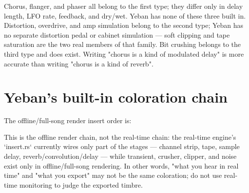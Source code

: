 Chorus, flanger, and phaser all belong to the first type; they differ only in delay length, LFO rate, feedback, and dry/wet. Yeban has none of these three built in. Distortion, overdrive, and amp simulation belong to the second type; Yeban has no separate distortion pedal or cabinet simulation — soft clipping and tape saturation are the two real members of that family. Bit crushing belongs to the third type and does exist. Writing "chorus is a kind of modulated delay" is more accurate than writing "chorus is a kind of reverb".

\section{Yeban's built-in coloration chain}

The offline/full-song render insert order is:

\begin{center}
\end{center}

This is the offline render chain, not the real-time chain: the real-time engine's `insert.rs` currently wires only part of the stages — channel strip, tape, sample delay, reverb/convolution/delay — while transient, crusher, clipper, and noise exist only in offline/full-song rendering. In other words, "what you hear in real time" and "what you export" may not be the same coloration; do not use real-time monitoring to judge the exported timbre.

